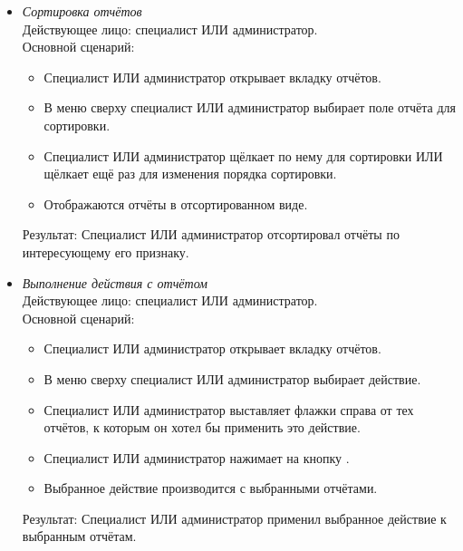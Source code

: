 \begin{itemize}[topsep=0pt, parsep=0pt, itemsep=0pt, leftmargin=*, labelindent=0.5cm]
	\item \textit{Сортировка отчётов} \\
	Действующее лицо: специалист ИЛИ администратор. \\
	Основной сценарий:
	\begin{itemize}[topsep=0pt, parsep=0pt, itemsep=0pt, leftmargin=*, labelindent=0.5cm]
		\item Специалист ИЛИ администратор открывает вкладку отчётов.
		\item В меню сверху специалист ИЛИ администратор выбирает поле отчёта для сортировки.
		\item Специалист ИЛИ администратор щёлкает по нему для сортировки ИЛИ щёлкает ещё раз для изменения порядка сортировки.
		\item Отображаются отчёты в отсортированном виде.
	\end{itemize}
	Результат: Специалист ИЛИ администратор отсортировал отчёты по интересующему его признаку.
\end{itemize}

\begin{itemize}[topsep=0pt, parsep=0pt, itemsep=0pt, leftmargin=*, labelindent=0.5cm]
	\item \textit{Выполнение действия с отчётом} \\
	Действующее лицо: специалист ИЛИ администратор. \\
	Основной сценарий:
	\begin{itemize}[topsep=0pt, parsep=0pt, itemsep=0pt, leftmargin=*, labelindent=0.5cm]
		\item Специалист ИЛИ администратор открывает вкладку отчётов.
		\item В меню сверху специалист ИЛИ администратор выбирает действие.
		\item Специалист ИЛИ администратор выставляет флажки справа от тех отчётов, к которым он хотел бы применить это действие.
		\item Специалист ИЛИ администратор нажимает на кнопку .
		\item Выбранное действие производится с выбранными отчётами.
	\end{itemize}
	Результат: Специалист ИЛИ администратор применил выбранное действие к выбранным отчётам.
\end{itemize}

